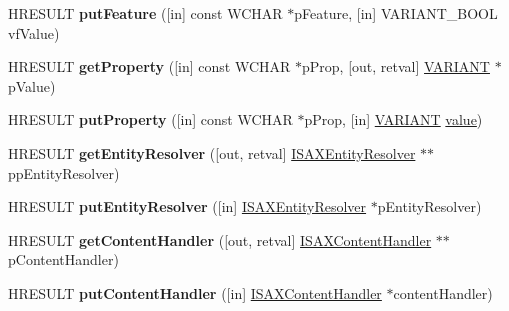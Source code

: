 \begin{DoxyCompactItemize}
H\+R\+E\+S\+U\+LT {\bfseries put\+Feature} (\mbox{[}in\mbox{]} const W\+C\+H\+AR $\ast$p\+Feature, \mbox{[}in\mbox{]} V\+A\+R\+I\+A\+N\+T\+\_\+\+B\+O\+OL vf\+Value)
\item 
\mbox{\label{interface_m_s_x_m_l2_1_1_i_s_a_x_x_m_l_reader_af8389e674e3029871dc1079109a76883}} 
H\+R\+E\+S\+U\+LT {\bfseries get\+Property} (\mbox{[}in\mbox{]} const W\+C\+H\+AR $\ast$p\+Prop, \mbox{[}out, retval\mbox{]} \hyperlink{structtag_v_a_r_i_a_n_t}{V\+A\+R\+I\+A\+NT} $\ast$p\+Value)
\item 
\mbox{\label{interface_m_s_x_m_l2_1_1_i_s_a_x_x_m_l_reader_afe52281bffd60ebf417d762776f59e6b}} 
H\+R\+E\+S\+U\+LT {\bfseries put\+Property} (\mbox{[}in\mbox{]} const W\+C\+H\+AR $\ast$p\+Prop, \mbox{[}in\mbox{]} \hyperlink{structtag_v_a_r_i_a_n_t}{V\+A\+R\+I\+A\+NT} \hyperlink{unionvalue}{value})
\item 
\mbox{\label{interface_m_s_x_m_l2_1_1_i_s_a_x_x_m_l_reader_a32edf4b3dccbef367949bd5b593c30e6}} 
H\+R\+E\+S\+U\+LT {\bfseries get\+Entity\+Resolver} (\mbox{[}out, retval\mbox{]} \hyperlink{interface_m_s_x_m_l2_1_1_i_s_a_x_entity_resolver}{I\+S\+A\+X\+Entity\+Resolver} $\ast$$\ast$pp\+Entity\+Resolver)
\item 
\mbox{\label{interface_m_s_x_m_l2_1_1_i_s_a_x_x_m_l_reader_acb43fff6e9ce8e001c6fa7af71a2b5f8}} 
H\+R\+E\+S\+U\+LT {\bfseries put\+Entity\+Resolver} (\mbox{[}in\mbox{]} \hyperlink{interface_m_s_x_m_l2_1_1_i_s_a_x_entity_resolver}{I\+S\+A\+X\+Entity\+Resolver} $\ast$p\+Entity\+Resolver)
\item 
\mbox{\label{interface_m_s_x_m_l2_1_1_i_s_a_x_x_m_l_reader_afdc4280795d73bec86c6196c9855006b}} 
H\+R\+E\+S\+U\+LT {\bfseries get\+Content\+Handler} (\mbox{[}out, retval\mbox{]} \hyperlink{interface_m_s_x_m_l2_1_1_i_s_a_x_content_handler}{I\+S\+A\+X\+Content\+Handler} $\ast$$\ast$p\+Content\+Handler)
\item 
\mbox{\label{interface_m_s_x_m_l2_1_1_i_s_a_x_x_m_l_reader_a5b8dfa33b33dec8b893c3068922632dc}} 
H\+R\+E\+S\+U\+LT {\bfseries put\+Content\+Handler} (\mbox{[}in\mbox{]} \hyperlink{interface_m_s_x_m_l2_1_1_i_s_a_x_content_handler}{I\+S\+A\+X\+Content\+Handler} $\ast$content\+Handler)

\end{DoxyCompactItemize}
